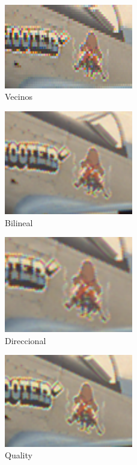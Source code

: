 {\begin{figure}
       \includegraphics[width=0.5\textwidth]{imagenes/img9_demosicing_vecino_cropped.png}
        \caption{Vecinos}
\end{figure}

\begin{figure}
       \includegraphics[width=0.5\textwidth]{imagenes/img9_demosicing_bilineal_cropped.png}
        \caption{Bilineal}
\end{figure}

\begin{figure}
       \includegraphics[width=0.5\textwidth]{imagenes/img9_demosicing_spline_cropped.png}
        \caption{Direccional}
\end{figure}

\begin{figure}
       \includegraphics[width=0.5\textwidth]{imagenes/img9_demosicing_quality_cropped.png}
        \caption{Quality}
\end{figure}

}
